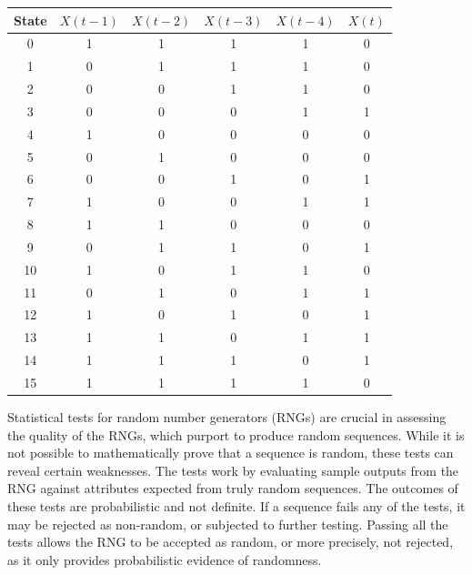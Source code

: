 \documentclass[12pt,openany]{book}
\theoremstyle{definition}
\begin{document}
\begin{table}[h]
	\centering
	\begin{tabular}{|c||c|c|c|c|c|}
		\hline
		\rowcolor{cyan} State & $X(t-1)$ & $X(t-2)$ & $X(t-3)$ & $X(t-4)$ & $X(t)$ \\
		\hline
		0 & \cellcolor{blue!20} 1 & \cellcolor{blue!20} 1 & \cellcolor{blue!20} 1 & \cellcolor{blue!20} 1 &  0\\
		\hline
		1 & 0 & 1 & 1 & 1 & 0 \\
		\hline
		2 & 0 & 0 & 1 & 1 & 0 \\
		\hline
		3 & 0 & 0 & 0 & 1 & 1 \\
		\hline
		4 & 1 & 0 & 0 & 0 & 0 \\
		\hline
		5 & 0 & 1 & 0 & 0 & 0 \\
		\hline
		6 & 0 & 0 & 1 & 0 & 1 \\
		\hline
		7 & 1 & 0 & 0 & 1 & 1 \\
		\hline
		8 & 1 & 1 & 0 & 0 & 0 \\
		\hline
		9 & 0 & 1 & 1 & 0 & 1 \\
		\hline
		10 & 1 & 0 & 1 & 1 & 0 \\
		\hline
		11 & 0 & 1 & 0 & 1 & 1 \\
		\hline
		12 & 1 & 0 & 1 & 0 & 1 \\
		\hline
		13 & 1 & 1 & 0 & 1 & 1 \\
		\hline
		14 & 1 & 1 & 1 & 0 & 1 \\
		\hline
		15 & \cellcolor{blue!20} 1 & \cellcolor{blue!20} 1 & \cellcolor{blue!20} 1 & \cellcolor{blue!20} 1 & 0 \\ %
		\hline
	\end{tabular}
\end{table}

\newpage
Statistical tests for random number generators (RNGs) are crucial in assessing the quality of the RNGs, which purport to produce random sequences. While it is not possible to mathematically prove that a sequence is random, these tests can reveal certain weaknesses. The tests work by evaluating sample outputs from the RNG against attributes expected from truly random sequences. The outcomes of these tests are probabilistic and not definite. If a sequence fails any of the tests, it may be rejected as non-random, or subjected to further testing. Passing all the tests allows the RNG to be accepted as random, or more precisely, not rejected, as it only provides probabilistic evidence of randomness.
\end{document}
